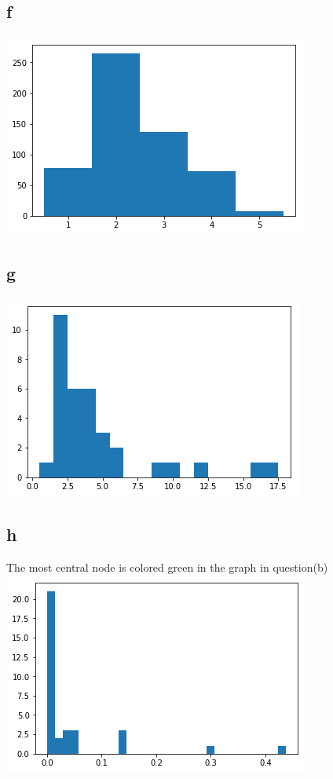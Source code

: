 \documentclass[12pt]{article}
\begin{document}
\subsection*{f}\includegraphics[scale = 0.7]{2.png}
\subsection*{g}\includegraphics[scale = 0.7]{3.png}
\subsection*{h} The most central node is colored green in the graph in question(b)\\
\includegraphics[scale = 0.7]{4.png}
\end{document}
